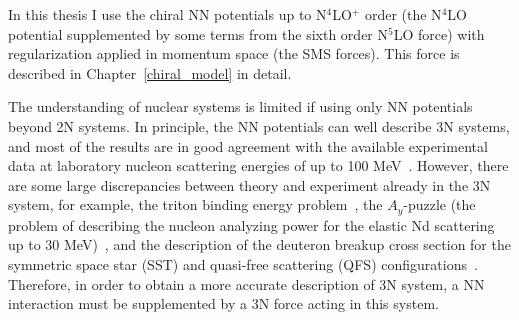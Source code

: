 In this thesis I use the chiral NN potentials up to N$^{4}$LO$^{+}$ order (the N$^{4}$LO potential supplemented by some terms from the sixth order N$^{5}$LO force) with regularization applied in momentum space (the SMS forces). This force is described in Chapter~\ref{chiral_model} in detail.

The understanding of nuclear systems is limited if using only NN potentials beyond 2N systems. In principle, the NN potentials can well describe 3N systems, and most of the results are in good agreement with the available experimental data at laboratory nucleon scattering energies of up to 100 MeV~\cite{Glockle1996}. However, there are some large discrepancies between theory and experiment already in the 3N system, for example, the triton binding energy problem~\cite{nogga1997triton, nogga2003three, perez2014triton}, the $A_y$-puzzle (the problem of describing the nucleon analyzing power for the elastic Nd scattering up to 30 MeV)~\cite{entem2002chiral}, and the description of the deuteron breakup cross section for the symmetric space star (SST)
and quasi-free scattering (QFS) configurations~\cite{witala2010discrepancies, witala2011nn}. Therefore, in order to obtain a more accurate description of 3N system, a NN interaction must be supplemented by a 3N force acting in this system.

